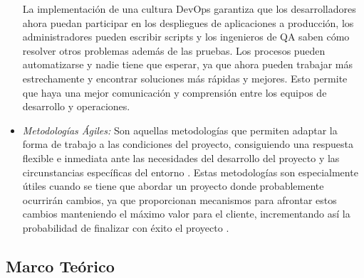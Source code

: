 \documentclass[letterpaper, 12pt, oneside]{article}
\begin{document}
\begin{itemize}
        La implementación de una cultura DevOps garantiza que los desarrolladores ahora puedan participar en los despliegues de aplicaciones a producción, los administradores pueden escribir scripts y los ingenieros de QA saben cómo resolver otros problemas además de las pruebas. Los procesos pueden automatizarse y nadie tiene que esperar, ya que ahora pueden trabajar más estrechamente y encontrar soluciones más rápidas y mejores. Esto permite que haya una mejor comunicación y comprensión entre los equipos de desarrollo y operaciones. \cite{devops}
        
        
        \item \textit{Metodologías Ágiles:} 
        Son aquellas metodologías que permiten adaptar la forma de trabajo a las condiciones del proyecto, consiguiendo una respuesta flexible e inmediata ante las necesidades del desarrollo del proyecto y las circunstancias específicas del entorno \cite{agiles}.
        Estas metodologías son especialmente útiles cuando se tiene que abordar un proyecto donde probablemente ocurrirán cambios, ya que proporcionan mecanismos para afrontar estos cambios manteniendo el máximo valor para el cliente, incrementando así la probabilidad de finalizar con éxito el proyecto \cite{agiles2} \cite{agiles3}.
        
    \end{itemize}
    
    \subsection{Marco Teórico}
    
\end{document}
